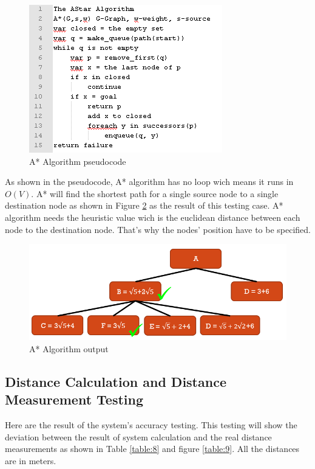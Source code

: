 \begin{enumerate}
	\begin{figure}[h!]
		\centering
		\includegraphics[scale=1]{figure9.PNG}
		\caption{A* Algorithm pseudocode
		}
		\label{fig:figure25}
	\end{figure}
	
	As shown in the pseudocode, A* algorithm has no loop wich means it runs in \textbf{$O(V)$}. A* will find the shortest path for a single source node to a single destination node as shown in Figure \ref{fig:figure25a} as the result of this testing case. A* algorithm needs the heuristic value wich is the euclidean distance between each node to the destination node. That's why the nodes' position have to be specified.
	
	\begin{figure}[h!]
		\centering
		\includegraphics[scale=0.7]{figure25.PNG}
		\caption{A* Algorithm output
		}
		\label{fig:figure25a}
	\end{figure}
	\vspace{40mm}
\end{enumerate}
\subsection{Distance Calculation and Distance Measurement Testing}
Here are the result of the system's accuracy testing. This testing will show the deviation between the result of system calculation and the real distance  measurements as shown in Table \ref{table:8} and figure \ref{table:9}. All the distances are in meters.

